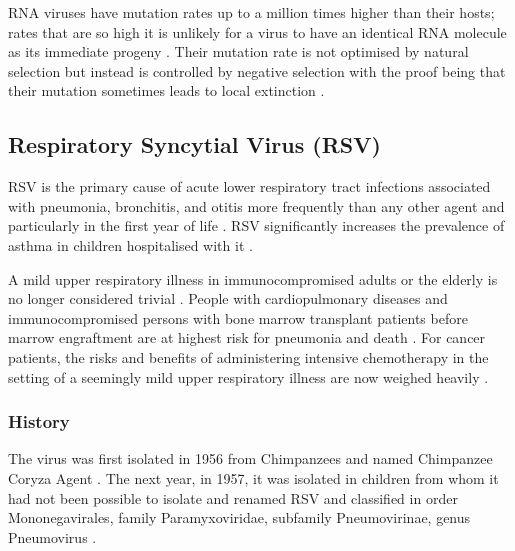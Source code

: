 \documentclass[10pt, a4paper]{article}
\begin{document}
RNA viruses have mutation rates up to a million times higher than their hosts;
rates that are so high it is unlikely for a virus to have an identical RNA
molecule as its immediate progeny \cite{domingoViralQuasispeciesEvolution2012}.
Their mutation rate is not optimised by natural selection but instead is
controlled by negative selection with the proof being that their mutation
sometimes leads to local extinction \cite{duffyWhyAreRNA2018}.

\subsection{Respiratory Syncytial Virus (RSV)}
\label{sec:orgb10c727}
RSV is the primary cause of acute lower respiratory tract infections associated
with pneumonia, bronchitis, and otitis
\cite{borchersRespiratorySyncytialVirus2013,kleinRoleRespiratorySyncytial1982,zlatevaMolecularEvolutionCirculation2004}
more frequently than any other agent and particularly in the first year of life
\cite{stottRespiratorySyncytialVirus1985}.
RSV significantly increases the prevalence of asthma in children hospitalised
with it \cite{saglaniViralInfectionsDevelopment2013}.

A mild upper respiratory illness in immunocompromised adults or the elderly is
no longer considered trivial \cite{whimbeyRespiratorySyncytialVirus2000}.
People with cardiopulmonary diseases and immunocompromised persons with bone
marrow transplant patients before marrow engraftment are at highest risk for
pneumonia and death \cite{morrisRecoveryCytopathogenicAgent1956}.
For cancer patients, the risks and benefits of administering intensive
chemotherapy in the setting of a seemingly mild upper respiratory illness are
now weighed heavily \cite{kleinRoleRespiratorySyncytial1982}.

\subsubsection{History}
\label{sec:org1232eaf}
The virus was first isolated in 1956 from Chimpanzees and named Chimpanzee
Coryza Agent \cite{morrisRecoveryCytopathogenicAgent1956}.
The next year, in 1957, it was isolated in
children from whom it had not been possible to isolate and renamed RSV and
classified in order Mononegavirales, family Paramyxoviridae, subfamily
Pneumovirinae, genus Pneumovirus
\cite{chanockRecoveryInfantsRespiratory1957,beemAssociationChimpanzeeCoryza1960,zlatevaGeneticVariabilityMolecular2005}.
\end{document}
